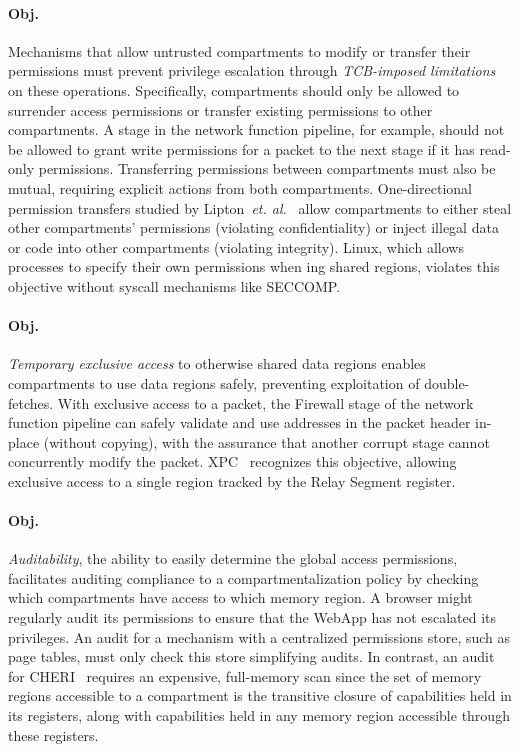 \paragraph{Obj. }
Mechanisms that allow untrusted compartments to modify or transfer their 
permissions must prevent privilege escalation %
through \emph{TCB-imposed limitations} on these operations.
Specifically, compartments should only be allowed to surrender access 
permissions or transfer existing permissions to other compartments.
A stage in the network function pipeline, for example, should not be allowed
to grant write permissions for a packet to the next stage if it has
read-only permissions.
Transferring permissions between compartments must also be mutual, requiring
explicit actions from both compartments.
One-directional permission transfers studied by 
Lipton~\textit{et. al.}~\cite{LiptonS77} 
allow compartments to either steal other compartments'
permissions (violating confidentiality) or
inject illegal data or code into other compartments (violating integrity).
Linux, which allows processes to specify their own permissions
when ing shared regions, violates this objective without 
syscall mechanisms like SECCOMP.

\paragraph{Obj. } 
\emph{Temporary exclusive access} to otherwise 
shared data regions enables compartments to use data regions safely,
preventing exploitation of double-fetches.
With exclusive access to a packet, the Firewall stage of the network function
pipeline can safely validate and use addresses in the packet header in-place 
(without copying), with the assurance that another corrupt stage cannot
concurrently modify the packet.
XPC~\cite{DuHXZC19XPC} recognizes this objective, allowing exclusive access
to a single region tracked by the Relay Segment register.

\paragraph{Obj. } 
\emph{Auditability}, the ability to easily determine the 
global access permissions, facilitates auditing compliance to a 
compartmentalization policy by checking which compartments have access to
which memory region.
A browser might regularly audit its permissions to ensure that the WebApp
has not escalated its privileges.
An audit for a mechanism with a centralized permissions store, 
such as page tables, must only check this store simplifying audits.
In contrast, an audit for CHERI~\cite{WatsonWNMACDDGL15} requires an 
expensive, full-memory scan since the set of memory regions accessible to a
compartment is the transitive closure of capabilities held in its registers,
along with capabilities held in any memory region accessible through these 
registers.


